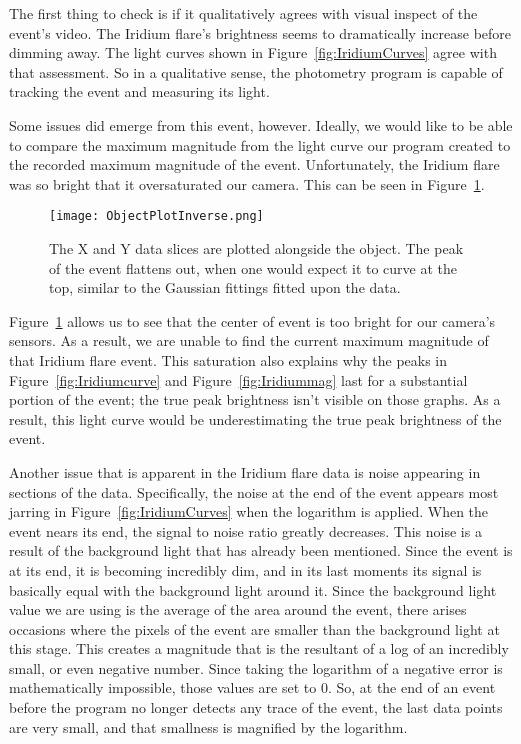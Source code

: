 The first thing to check is if it qualitatively agrees with visual inspect of the event's video. The Iridium flare's brightness seems to dramatically increase before dimming away. The light curves shown in Figure~\ref{fig:IridiumCurves} agree with that assessment. So in a qualitative sense, the photometry program is capable of tracking the event and measuring its light. 

Some issues did emerge from this event, however. Ideally, we would like to be able to compare the maximum magnitude from the light curve our program created to the recorded maximum magnitude of the event. Unfortunately, the Iridium flare was so bright that it oversaturated our camera. This can be seen in Figure~\ref{fig:ObjectPlot055}.
\begin{figure}[ht!]
	\centering
	\texttt{[image: ObjectPlotInverse.png]}
	\caption{The X and Y data slices are plotted alongside the object. The peak of the event flattens out, when one would expect it to curve at the top, similar to the Gaussian fittings fitted upon the data.}
	\label{fig:ObjectPlot055}
\end{figure}
Figure~\ref{fig:ObjectPlot055} allows us to see that the center of event is too bright for our camera's sensors. As a result, we are unable to find the current maximum magnitude of that Iridium flare event. This saturation also explains why the peaks in Figure~\ref{fig:Iridiumcurve} and Figure~\ref{fig:Iridiummag} last for a substantial portion of the event; the true peak brightness isn't visible on those graphs. As a result, this light curve would be underestimating the true peak brightness of the event.

Another issue that is apparent in the Iridium flare data is noise appearing in sections of the data. Specifically, the noise at the end of the event appears most jarring in Figure~\ref{fig:IridiumCurves} when the logarithm is applied. When the event nears its end, the signal to noise ratio greatly decreases. This noise is a result of the background light that has already been mentioned. Since the event is at its end, it is becoming incredibly dim, and in its last moments its signal is basically equal with the background light around it. Since the background light value we are using is the average of the area around the event, there arises occasions where the pixels of the event are smaller than the background light at this stage. This creates a magnitude that is the resultant of a log of an incredibly small, or even negative number. Since taking the logarithm of a negative error is mathematically impossible, those values are set to 0. So, at the end of an event before the program no longer detects any trace of the event, the last data points are very small, and that smallness is magnified by the logarithm.

